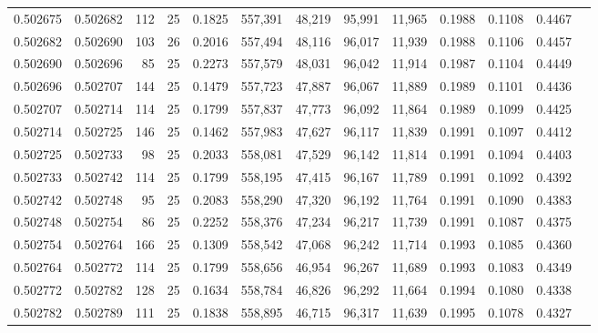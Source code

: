 \begin{tabular}{rrrrrrrrrrrrr}
0.502675 & 0.502682 & 112 &  25 &                                     0.1825 & 557,391 &  48,219 &  95,991 &  11,965 & 0.1988 & 0.1108 & 0.4467 \\
0.502682 & 0.502690 & 103 &  26 &                                     0.2016 & 557,494 &  48,116 &  96,017 &  11,939 & 0.1988 & 0.1106 & 0.4457 \\
0.502690 & 0.502696 &  85 &  25 &                                     0.2273 & 557,579 &  48,031 &  96,042 &  11,914 & 0.1987 & 0.1104 & 0.4449 \\
0.502696 & 0.502707 & 144 &  25 &                                     0.1479 & 557,723 &  47,887 &  96,067 &  11,889 & 0.1989 & 0.1101 & 0.4436 \\
0.502707 & 0.502714 & 114 &  25 &                                     0.1799 & 557,837 &  47,773 &  96,092 &  11,864 & 0.1989 & 0.1099 & 0.4425 \\
0.502714 & 0.502725 & 146 &  25 &                                     0.1462 & 557,983 &  47,627 &  96,117 &  11,839 & 0.1991 & 0.1097 & 0.4412 \\
0.502725 & 0.502733 &  98 &  25 &                                     0.2033 & 558,081 &  47,529 &  96,142 &  11,814 & 0.1991 & 0.1094 & 0.4403 \\
0.502733 & 0.502742 & 114 &  25 &                                     0.1799 & 558,195 &  47,415 &  96,167 &  11,789 & 0.1991 & 0.1092 & 0.4392 \\
0.502742 & 0.502748 &  95 &  25 &                                     0.2083 & 558,290 &  47,320 &  96,192 &  11,764 & 0.1991 & 0.1090 & 0.4383 \\
0.502748 & 0.502754 &  86 &  25 &                                     0.2252 & 558,376 &  47,234 &  96,217 &  11,739 & 0.1991 & 0.1087 & 0.4375 \\
0.502754 & 0.502764 & 166 &  25 &                                     0.1309 & 558,542 &  47,068 &  96,242 &  11,714 & 0.1993 & 0.1085 & 0.4360 \\
0.502764 & 0.502772 & 114 &  25 &                                     0.1799 & 558,656 &  46,954 &  96,267 &  11,689 & 0.1993 & 0.1083 & 0.4349 \\
0.502772 & 0.502782 & 128 &  25 &                                     0.1634 & 558,784 &  46,826 &  96,292 &  11,664 & 0.1994 & 0.1080 & 0.4338 \\
0.502782 & 0.502789 & 111 &  25 &                                     0.1838 & 558,895 &  46,715 &  96,317 &  11,639 & 0.1995 & 0.1078 & 0.4327 \\

\end{tabular}
